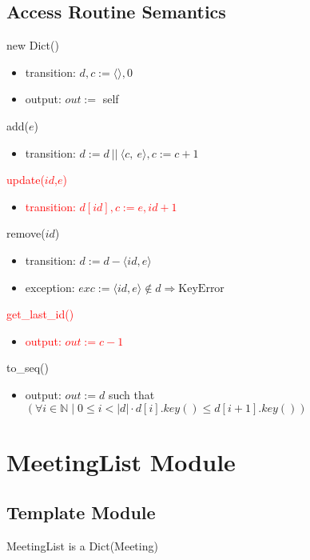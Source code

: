 \documentclass[12pt, titlepage]{article}
\begin{document}
\subsection*{Access Routine Semantics}
\noindent new Dict()
\begin{itemize}
    \item transition: $d, c := \langle \rangle, 0$
    
    \item output: $out :=$ self
\end{itemize}

\noindent add($e$)
\begin{itemize}
    \item transition: $d :=  d\ ||\ \langle c,\ e \rangle, c := c + 1$
\end{itemize}

\noindent\textcolor{red}{update($id$,$e$)}
\begin{itemize}
    \item \textcolor{red}{transition: $d[id],c := e,id+1$}
\end{itemize}

\noindent remove($id$)
\begin{itemize}
    \item transition: $d :=  d - \langle id, e \rangle$
    \item exception: $exc := \langle id, e \rangle \notin d \Rightarrow \text{KeyError}$
\end{itemize}

\noindent\textcolor{red}{get\_last\_id()}
\begin{itemize}
    \item \textcolor{red}{output: $out := c - 1$}
\end{itemize}

\noindent to\_seq()
\begin{itemize}
    \item output: $out := d$ such that $(\forall i \in \mathbb{N} \mid 0 \leq i < |d| \cdot d[i].key() \leq d[i + 1].key())$
\end{itemize}

\newpage
\section* {MeetingList Module}

\subsection*{Template Module}
MeetingList is a Dict(Meeting)
\end{document}
